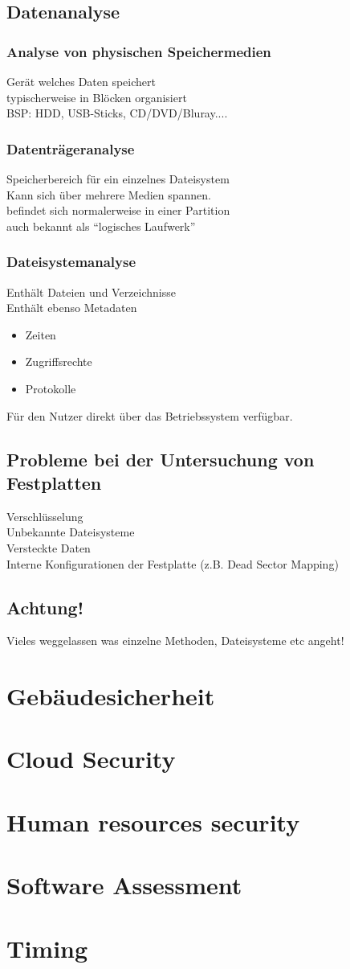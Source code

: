 \documentclass{article} %
\begin{document}
\subsection{Datenanalyse}
\subsubsection{Analyse von physischen Speichermedien}
Gerät welches Daten speichert\\
typischerweise in Blöcken organisiert\\
BSP: HDD, USB-Sticks, CD/DVD/Bluray....
\subsubsection{Datenträgeranalyse}
Speicherbereich für ein einzelnes Dateisystem\\
Kann sich über mehrere Medien spannen.\\
befindet sich normalerweise in einer Partition\\
auch bekannt als "`logisches Laufwerk"'
\subsubsection{Dateisystemanalyse}
Enthält Dateien und Verzeichnisse\\
Enthält ebenso Metadaten
\begin{itemize}
	\item Zeiten
    \item Zugriffsrechte
    \item Protokolle
\end{itemize}
Für den Nutzer direkt über das Betriebssystem verfügbar.
\subsection{Probleme bei der Untersuchung von Festplatten}
Verschlüsselung\\
Unbekannte Dateisysteme\\
Versteckte Daten\\
Interne Konfigurationen der Festplatte (z.B. Dead Sector Mapping)\\
\subsection{Achtung!}
Vieles weggelassen was einzelne Methoden, Dateisysteme etc angeht!



\section{Gebäudesicherheit}
\section{Cloud Security}
\section{Human resources security}
\section{Software Assessment}
\section{Timing}
\end{document}
